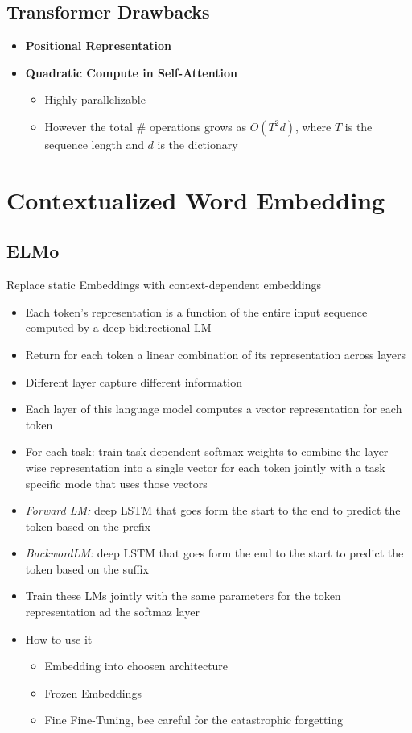 \section{Transformer Drawbacks}
\begin{itemize}
    \item \textbf{Positional Representation}
    \item \textbf{Quadratic Compute in Self-Attention}
    \begin{itemize}
        \item Highly parallelizable
        \item However the total \# operations grows as \(O(T^2d)\), where \(T\) is the sequence length and \(d\) is the dictionary
    \end{itemize}
\end{itemize}

\chapter{Contextualized Word Embedding}
\section{ELMo}
Replace static Embeddings with context-dependent embeddings
\begin{itemize}
    \item Each token's representation is a function of the entire input sequence computed by a deep bidirectional LM
    \item Return for each token a linear combination of its representation across layers
    \item Different layer capture different information
    \item Each layer of this language model computes a vector representation for each token
    \item For each task: train task dependent softmax weights to combine the layer wise representation into a single vector for each token jointly with a task specific mode that uses those vectors
    \item \textit{Forward LM:} deep LSTM that goes form the start to the end to predict the token based on the prefix
    \item \textit{BackwordLM:} deep LSTM that goes form the end to the start to predict the token based on the suffix
    \item Train these LMs jointly with the same parameters for the token representation ad the softmaz layer
    \item How to use it
    \begin{itemize}
        \item Embedding into choosen architecture
        \item Frozen Embeddings
        \item Fine Fine-Tuning, bee careful for the catastrophic forgetting
    \end{itemize}
\end{itemize}

